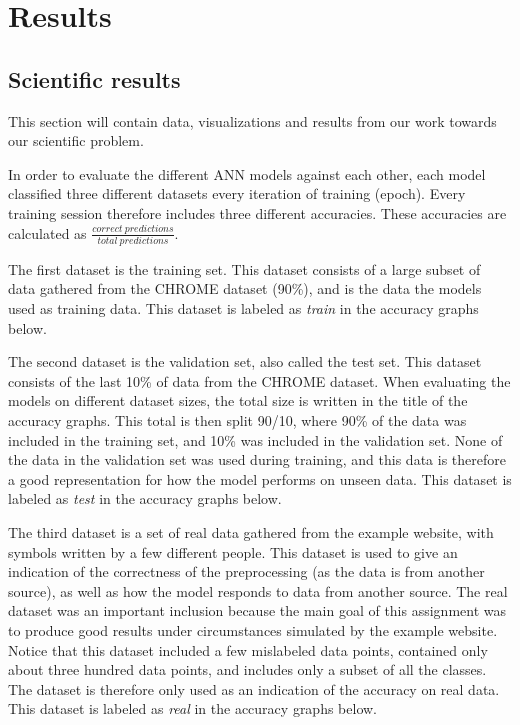 \chapter{Results}

\section{Scientific results}
This section will contain data, visualizations and results from our work towards our scientific problem.  

In order to evaluate the different ANN models against each other, each model classified three different datasets every iteration of training (epoch). Every training session therefore includes three different accuracies. These accuracies are calculated as $\frac{correct\  predictions}{total\ predictions}$.  

The first dataset is the training set. This dataset consists of a large subset of data gathered from the CHROME dataset (90\%), and is the data the models used as training data. This dataset is labeled as \textit{train} in the accuracy graphs below.

The second dataset is the validation set, also called the test set. This dataset consists of the last 10\% of data from the CHROME dataset. When evaluating the models on different dataset sizes, the total size is written in the title of the accuracy graphs. This total is then split 90/10, where 90\% of the data was included in the training set, and 10\% was included in the validation set. None of the data in the validation set was used during training, and this data is therefore a good representation for how the model performs on unseen data. This dataset is labeled as \textit{test} in the accuracy graphs below.

The third dataset is a set of real data gathered from the example website, with symbols written by a few different people. This dataset is used to give an indication of the correctness of the preprocessing (as the data is from another source), as well as how the model responds to data from another source. The real dataset was an important inclusion because the main goal of this assignment was to produce good results under circumstances simulated by the example website. Notice that this dataset included a few mislabeled data points, contained only about three hundred data points, and includes only a subset of all the classes. The dataset is therefore only used as an indication of the accuracy on real data. This dataset is labeled as \textit{real} in the accuracy graphs below.


